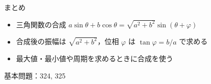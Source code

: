 \documentclass[aspectratio=43,professionalfonts,handout]{beamer}
\begin{document}
\begin{frame}{まとめ}
  \begin{itemize}
    \item 三角関数の合成 $a\sin\theta + b\cos\theta = \sqrt{a^2+b^2}\sin(\theta+\varphi)$
    \item 合成後の振幅は $\sqrt{a^2+b^2}$，位相 $\varphi$ は $\tan\varphi = b/a$ で求める
    \item 最大値・最小値や周期を求めるときに合成を使う
  \end{itemize}

  \vfill
  {\small 基本問題：324, 325}
\end{frame}
\end{document}
